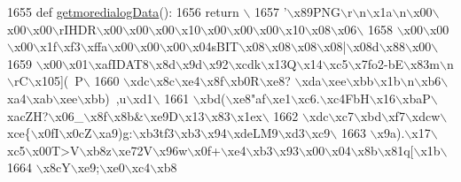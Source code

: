 \begin{DoxyCode}
1655 \textcolor{keyword}{def }\hyperlink{namespaceimages_a78cb338a47bd555e7036963d52cd7412}{getmoredialogData}():
1656     \textcolor{keywordflow}{return} \(\backslash\)
1657 \textcolor{stringliteral}{'\(\backslash\)x89PNG\(\backslash\)r\(\backslash\)n\(\backslash\)x1a\(\backslash\)n\(\backslash\)x00\(\backslash\)x00\(\backslash\)x00\(\backslash\)rIHDR\(\backslash\)x00\(\backslash\)x00\(\backslash\)x00\(\backslash\)x10\(\backslash\)x00\(\backslash\)x00\(\backslash\)x00\(\backslash\)x10\(\backslash\)x08\(\backslash\)x06\(\backslash\)}
1658 \textcolor{stringliteral}{\(\backslash\)x00\(\backslash\)x00\(\backslash\)x00\(\backslash\)x1f\(\backslash\)xf3\(\backslash\)xffa\(\backslash\)x00\(\backslash\)x00\(\backslash\)x00\(\backslash\)x04sBIT\(\backslash\)x08\(\backslash\)x08\(\backslash\)x08\(\backslash\)x08|\(\backslash\)x08d\(\backslash\)x88\(\backslash\)x00\(\backslash\)}
1659 \textcolor{stringliteral}{\(\backslash\)x00\(\backslash\)x01\(\backslash\)xafIDAT8\(\backslash\)x8d\(\backslash\)x9d\(\backslash\)x92\(\backslash\)xcdk\(\backslash\)x13Q\(\backslash\)x14\(\backslash\)xc5\(\backslash\)x7fo2-bE\(\backslash\)x83m\(\backslash\)n\(\backslash\)rC\(\backslash\)x105](~P\(\backslash\)}
1660 \textcolor{stringliteral}{\(\backslash\)xdc\(\backslash\)x8c\(\backslash\)xe4\(\backslash\)x8f\(\backslash\)xb0R\(\backslash\)xe8? \(\backslash\)xda\(\backslash\)xee\(\backslash\)xbb\(\backslash\)x1b\(\backslash\)n\(\backslash\)xb6\(\backslash\)xa4\(\backslash\)xab\(\backslash\)xee\(\backslash\)xbb)~,u\(\backslash\)xd1\(\backslash\)}
1661 \textcolor{stringliteral}{\(\backslash\)xbd(\(\backslash\)xe8"af\(\backslash\)xe1\(\backslash\)xc6.\(\backslash\)xc4FbH\(\backslash\)x16\(\backslash\)xbaP\(\backslash\)xacZH?\(\backslash\)x06\_\(\backslash\)x8f\(\backslash\)x8b&\(\backslash\)xe9D\(\backslash\)x13\(\backslash\)x83\(\backslash\)x1ex\(\backslash\)}
1662 \textcolor{stringliteral}{\(\backslash\)xdc\(\backslash\)xc7\(\backslash\)xbd\(\backslash\)xf7\(\backslash\)xdcw\(\backslash\)xce\{\(\backslash\)x0fI\(\backslash\)x0cZ\(\backslash\)xa9)g:\(\backslash\)xb3tf3\(\backslash\)xb3\(\backslash\)x94\(\backslash\)xdeLM9\(\backslash\)xd3\(\backslash\)xc9\(\backslash\)}
1663 \textcolor{stringliteral}{\(\backslash\)x9a).\(\backslash\)x17\(\backslash\)xc5\(\backslash\)x00T>V\(\backslash\)xb8z\(\backslash\)xe72V\(\backslash\)x96w\(\backslash\)x0f+\(\backslash\)xe4\(\backslash\)xb3\(\backslash\)x93\(\backslash\)x00\(\backslash\)x04\(\backslash\)x8b\(\backslash\)x81q[\(\backslash\)x1b\(\backslash\)}
1664 \textcolor{stringliteral}{\(\backslash\)x8cY\(\backslash\)xe9;\(\backslash\)xe0\(\backslash\)xc4\(\backslash\)xb8%
}
\end{DoxyCode}
